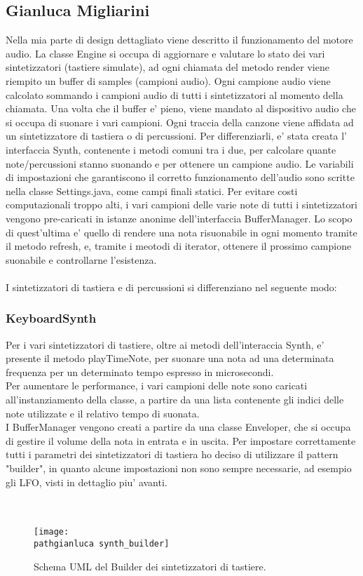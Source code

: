 \documentclass[a4paper,12pt]{report}
\newcommand\pathgianluca{img/gianluca/}
\begin{document}
\subsection{Gianluca Migliarini}
Nella mia parte di design dettagliato viene descritto il funzionamento del motore audio.
La classe Engine si occupa di aggiornare e valutare lo stato dei vari sintetizzatori (tastiere simulate), ad ogni chiamata del metodo render viene riempito un buffer di samples (campioni audio). Ogni campione audio viene calcolato sommando i campioni audio di tutti i sintetizzatori al momento della chiamata.
Una volta che il buffer e' pieno, viene mandato al dispositivo audio che si occupa di suonare i vari campioni.
Ogni traccia della canzone viene affidata ad un sintetizzatore di tastiera o di percussioni. Per differenziarli, e' stata creata l' interfaccia Synth, contenente i metodi comuni tra i due, per calcolare quante note/percussioni stanno suonando e per ottenere un campione audio.
Le variabili di impostazioni che garantiscono il corretto funzionamento dell'audio sono scritte nella classe Settings.java, come campi finali statici.
Per evitare costi computazionali troppo alti, i vari campioni delle varie note di tutti i sintetizzatori vengono pre-caricati in istanze anonime dell'interfaccia BufferManager. Lo scopo di quest'ultima e' quello di rendere una nota risuonabile in ogni momento tramite il metodo refresh, e, tramite i meotodi di iterator, ottenere il prossimo campione suonabile e controllarne l'esistenza. \\ \\
I sintetizzatori di tastiera e di percussioni si differenziano nel seguente modo:
\newpage
\subsubsection{KeyboardSynth}
Per i vari sintetizzatori di tastiere, oltre ai metodi dell'interaccia Synth, e' presente il metodo playTimeNote, per suonare una nota ad una determinata frequenza per un determinato tempo espresso in microsecondi. \\
Per aumentare le performance, i vari campioni delle note sono caricati all'instanziamento della classe, a partire da una lista contenente gli indici delle note utilizzate e il relativo tempo di suonata. \\
I BufferManager vengono creati a partire da una classe Enveloper, che si occupa di gestire il volume della nota in entrata e in uscita.
Per impostare correttamente tutti i parametri dei sintetizzatori di tastiera ho deciso di utilizzare il pattern "builder", in quanto alcune impostazioni non sono sempre necessarie, ad esempio gli LFO, visti in dettaglio piu' avanti. \\ \\ \\
\begin{figure}[!htb]
	\centerline{\texttt{[image: \\pathgianluca synth\_builder]}}
	\caption{Schema UML del Builder dei sintetizzatori di tastiere.}
	\label{img:SynthBuilder}
\end{figure}
\clearpage
\end{document}
